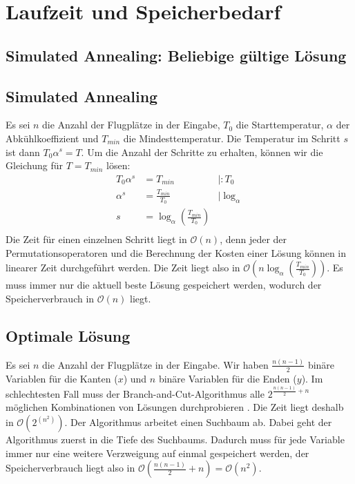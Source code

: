 \documentclass[a4paper,10pt,ngerman]{scrartcl}
\begin{document}
\section{Laufzeit und Speicherbedarf}
\subsection{Simulated Annealing: Beliebige gültige Lösung}
\subsection{Simulated Annealing}
Es sei $n$ die Anzahl der Flugplätze in der Eingabe, $T_0$ die Starttemperatur,
$\alpha$ der Abkühlkoeffizient und $T_{min}$ die Mindesttemperatur. Die
Temperatur im Schritt $s$ ist dann $T_0\alpha^s=T$. Um die Anzahl der Schritte
zu erhalten, können wir die Gleichung für $T=T_{min}$ lösen:
\begin{align*}
  T_0\alpha^s & = T_{min}                            & |:T_0          \\
  \alpha^s    & = \frac{T_{min}}{T_0}                & |\log_{\alpha} \\
  s           & = \log_{\alpha}(\frac{T_{min}}{T_0})                  \\
\end{align*}
Die Zeit für einen einzelnen Schritt liegt in $\mathcal{O}(n)$, denn jeder der Permutationsoperatoren
und die Berechnung der Kosten einer Lösung können in linearer Zeit durchgeführt werden. Die Zeit liegt also in
$\mathcal{O}(n\log_{\alpha}(\frac{T_{min}}{T_0}))$. Es muss immer nur die aktuell beste Lösung gespeichert werden,
wodurch der Speicherverbrauch in $\mathcal{O}(n)$ liegt.
\subsection{Optimale Lösung}
Es sei $n$ die Anzahl der Flugplätze in der Eingabe. Wir haben
$\frac{n(n-1)}{2}$ binäre Variablen für die Kanten ($x$) und $n$ binäre
Variablen für die Enden ($y$). Im schlechtesten Fall muss der
Branch-and-Cut-Algorithmus alle $2^{\frac{n(n-1)}{2}+n}$ möglichen
Kombinationen von Lösungen durchprobieren \cite[653]{korte_2018}. Die Zeit
liegt deshalb in $\mathcal{O}(2^(n^2))$. Der Algorithmus arbeitet einen
Suchbaum ab. Dabei geht der Algorithmus zuerst in die Tiefe des Suchbaums.
Dadurch muss für jede Variable immer nur eine weitere Verzweigung auf einmal
gespeichert werden, der Speicherverbrauch liegt also in
$\mathcal{O}(\frac{n(n-1)}{2}+n) = \mathcal{O}(n^2)$.
\end{document}
